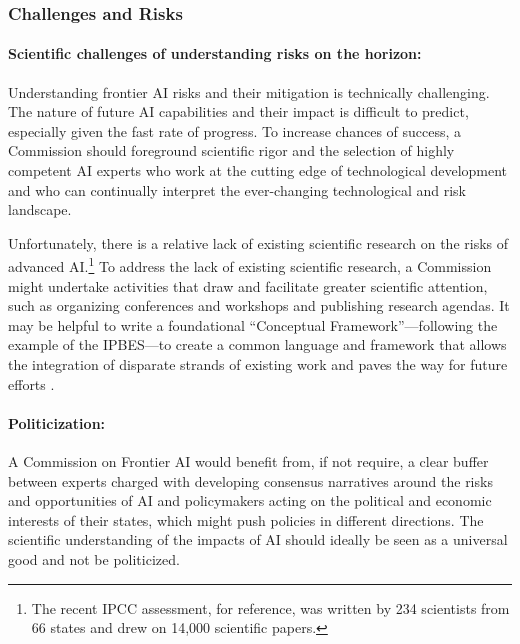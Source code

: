 \documentclass[12pt]{article}
\begin{document}
\subsubsection*{Challenges and Risks}

\paragraph{Scientific challenges of understanding risks on the horizon:}
Understanding frontier AI risks and their mitigation is technically
challenging. The nature of future AI capabilities and their impact is
difficult to predict, especially given the fast rate of progress. To
increase chances of success, a Commission should foreground scientific
rigor and the selection of highly competent AI experts who work at the
cutting edge of technological development and who can continually
interpret the ever-changing technological and risk landscape.

Unfortunately, there is a relative lack of existing scientific research
on the risks of advanced AI.\footnote{The recent IPCC assessment, for
reference, was written by 234 scientists from 66 states and drew on
14,000 scientific papers.} To address the lack of existing scientific
research, a Commission might undertake activities that draw and
facilitate greater scientific attention, such as organizing conferences
and workshops and publishing research agendas. It may be helpful to
write a foundational ``Conceptual Framework''---following the example of
the IPBES---to create a common language and framework that
allows the integration of disparate strands of existing work and paves
the way for future efforts \cite{diaz_ipbes_2015}.

\paragraph{Politicization:} A Commission on Frontier AI would benefit from,
if not require, a clear buffer between experts charged with developing
consensus narratives around the risks and opportunities of AI and
policymakers acting on the political and economic interests of their
states, which might push policies in different directions. 
The scientific understanding of the impacts of AI should ideally 
be seen as a universal good and not be politicized. 
\end{document}

